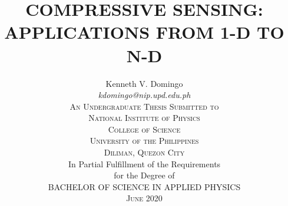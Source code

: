 \documentclass[12pt,oneside]{report}
\begin{document}

\title{
	\Large\uppercase\expandafter{Compressive sensing: Applications from 1-D to N-D
	}
}

\author{
	\large\rm\expandafter{
	Kenneth V. Domingo 
	}\\
	\large\textit{\expandafter{
		kdomingo@nip.upd.edu.ph
	}}\\
	\textsc{An Undergraduate Thesis Submitted to}\\
	\textsc{National Institute of Physics}\\
	\textsc{College of Science}\\
	\textsc{University of the Philippines} \\
	\textsc{Diliman, Quezon City}\\
	\vskip0.25in
	\rm In Partial Fulfillment of the Requirements\\
	\rm for the Degree of\\
	\rm\uppercase\expandafter{Bachelor of Science}
	\rm\uppercase{in}
	\rm\uppercase\expandafter{Applied Physics}\\
	\textsc\expandafter{June 2020}
}

\maketitle
\thispagestyle{titlestyle}




\tableofcontents
\listoffigures
\listoftables

\cleardoublepage
{}












\appendix

\end{document}
